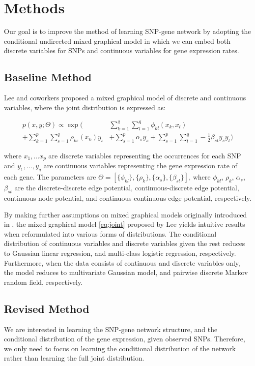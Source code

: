 \documentclass{article}
\begin{document}
\section{Methods}
\label{Methods}
Our goal is to improve the method of learning SNP-gene network by adopting the conditional undirected mixed graphical model in which we can embed both discrete variables for SNPs and continuous variables for gene expression rates.

\subsection{Baseline Method}
Lee and coworkers \cite{lee2013structure} proposed a mixed graphical model of discrete and continuous variables, where the joint distribution is expressed as:

\begin{align}
p(x, y ; \Theta) \propto \exp \Big( &\sum_{k=1}^{q} \sum_{l=1}^{q} \phi_{kl} (x_k, x_l) \nonumber \\
+ \sum_{k=1}^{p} \sum_{s=1}^{q} \rho_{ks}(x_k) y_s  &+ \sum_{s=1}^{p} \alpha_s y_s + \sum_{s=1}^{p} \sum_{t=1}^{q} -\frac{1}{2} \beta_{st} y_s y_t \Big) \label{eq:joint}
\end{align} 

where $x_1, ... x_p$ are discrete variables representing the occurrences for each SNP and $y_1, ..., y_q$ are continuous variables representing the gene expression rate of each gene. 
The parameters are $\Theta = [\{\phi_{kl}\}, \{\rho_{k}\}, \{\alpha_{s}\}, \{\beta_{st}\}]$, where $\phi_{kl}$, $\rho_{k}$, $\alpha_{s}$, $\beta_{st}$ are the discrete-discrete edge potential, continuous-discrete edge potential, continuous node potential, and continuous-continuous edge potential, respectively.

By making further assumptions on mixed graphical models originally introduced in \cite{lauritzen1989graphical}, the mixed graphical model \ref{eq:joint} proposed by Lee \cite{lee2013structure} yields intuitive results when reformulated into various forms of distributions. The conditional distribution of continuous variables and discrete variables given the rest reduces to Gaussian linear regression, and multi-class logistic regression, respectively. Furthermore, when the data consists of continuous and discrete variables only, the model reduces to multivariate Gaussian model, and pairwise discrete Markov random field, respectively. 

\subsection{Revised Method}
We are interested in learning the SNP-gene network structure, and the conditional distribution of the gene expression, given observed SNPs.
Therefore, we only need to focus on learning the conditional distribution of the network rather than learning the full joint distribution. 
\end{document}
